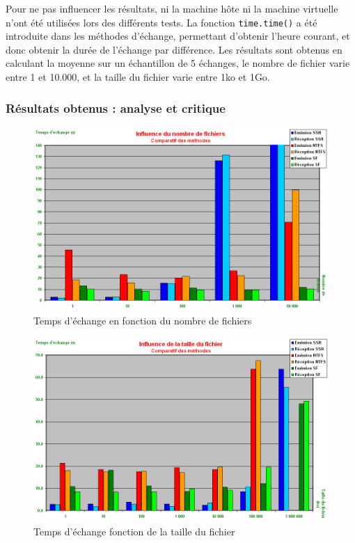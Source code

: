 Pour ne pas influencer les résultats, ni la machine hôte ni la machine virtuelle n'ont été utilisées lors des différents tests.
La fonction \lstinline{time.time()} a été introduite dans les méthodes d'échange, permettant d'obtenir l'heure courant, et donc obtenir la durée de l'échange par différence.
Les résultats sont obtenus en calculant la moyenne sur un échantillon de 5 échanges, le nombre de fichier varie entre 1 et 10.000, et la taille du fichier varie entre 1ko et 1Go.
\\




\subsubsection{Résultats obtenus : analyse et critique}

\begin{figure}[!h]
	\center
	\includegraphics[scale=0.45]{img/tests/nombre_comparatif.png}
	\caption{Temps d'échange en fonction du nombre de fichiers}
	\label{temps=f(nombre) - comparatif}
\end{figure}

\begin{figure}[!h]
	\center
	\includegraphics[scale=0.45]{img/tests/taille_comparatif.png}
	\caption{Temps d'échange fonction de la taille du fichier}
	\label{temps=f(taille) - comparatif}
\end{figure}

